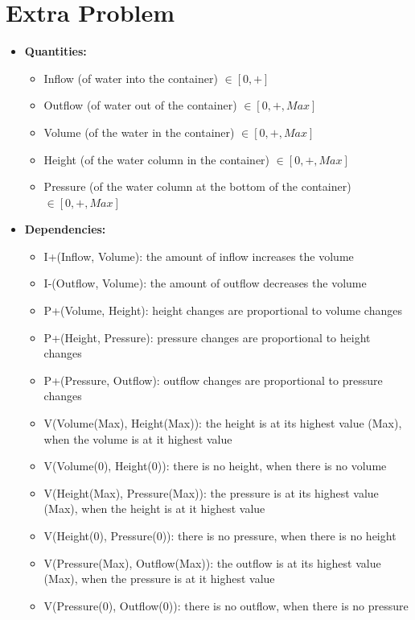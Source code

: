 \documentclass[a4paper]{article}
\begin{document}
\section{Extra Problem}

\begin{itemize}
\item \textbf{Quantities:}
\begin{itemize}
\item Inflow (of water into the container) $\in [0, +]$
\item Outflow (of water out of the container) $\in [0, +, Max]$
\item Volume (of the water in the container) $\in [0, +, Max]$
\item Height (of the water column in the container) $\in [0, +, Max]$
\item Pressure (of the water column at the bottom of the container) $\in [0, +, Max]$
\end{itemize}

\item \textbf{Dependencies:}

\begin{itemize}
\item I+(Inflow, Volume): the amount of inflow increases the volume
\item I-(Outflow, Volume): the amount of outflow decreases the volume
\item P+(Volume, Height): height changes are proportional to volume changes
\item P+(Height, Pressure): pressure changes are proportional to height changes
\item P+(Pressure, Outflow): outflow changes are proportional to pressure changes
\item V(Volume(Max), Height(Max)): the height is at its highest value (Max), when the volume is at it highest value
\item V(Volume(0), Height(0)): there is no height, when there is no volume
\item V(Height(Max), Pressure(Max)): the pressure is at its highest value (Max), when the height is at it highest value
\item V(Height(0), Pressure(0)): there is no pressure, when there is no height
\item V(Pressure(Max), Outflow(Max)): the outflow is at its highest value (Max), when the pressure is at it highest value
\item V(Pressure(0), Outflow(0)): there is no outflow, when there is no pressure
\end{itemize}
\end{itemize}
\end{document}
